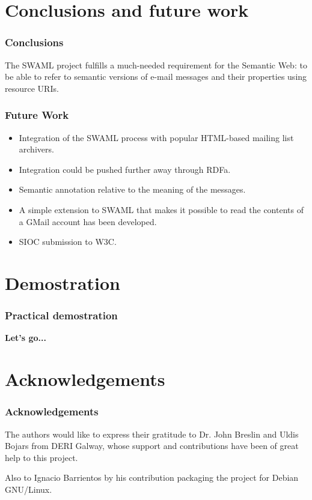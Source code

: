 \documentclass[spanish,notes=hide,16pt]{beamer}
\begin{document}
\section{Conclusions and future work}
\frame
{
  \frametitle{Conclusions}

  \begin{Large}
    The SWAML project fulfills a much-needed requirement for the Semantic Web: 
    to be able to refer to semantic versions of e-mail messages and their properties 
    using resource URIs.
  \end{Large}
}
\frame
{
  \frametitle{Future Work}

  \begin{itemize}
   \item \begin{Large}Integration of the SWAML process with popular HTML-based mailing list archivers.\end{Large}
   \item \begin{Large}Integration could be pushed further away through RDFa.\end{Large}
   \item \begin{Large}Semantic annotation relative to the meaning of the messages.\end{Large}
   \item \begin{Large}A simple extension to SWAML that makes it possible to read the contents of a GMail account has 
		been developed.\end{Large}
   \item \begin{Large}SIOC submission to W3C.\end{Large}
  \end{itemize}
}

\section{Demostration}
\frame
{
  \frametitle{Practical demostration}

  \begin{center}
    \LARGE{\textbf{Let's go...}}
  \end{center}
}

\appendix

\section{Acknowledgements}
\frame
{
  \frametitle{Acknowledgements}
  
  \begin{Large}
    The authors would like to express their gratitude to Dr. John Breslin and 
    Uldis Bojars from DERI Galway, whose support and contributions have been 
    of great help to this project. 
  \end{Large}

  \vspace{1cm}

  \begin{Large}
    Also to Ignacio Barrientos by his contribution packaging the project for 
    Debian GNU/Linux.
  \end{Large}
}
\end{document}
